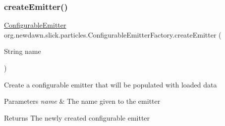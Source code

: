 \subsubsection{\texorpdfstring{create\+Emitter()}{createEmitter()}}
{\footnotesize\ttfamily \mbox{\hyperlink{classorg_1_1newdawn_1_1slick_1_1particles_1_1_configurable_emitter}{Configurable\+Emitter}} org.\+newdawn.\+slick.\+particles.\+Configurable\+Emitter\+Factory.\+create\+Emitter (\begin{DoxyParamCaption}\item[{String}]{name }\end{DoxyParamCaption})}

Create a configurable emitter that will be populated with loaded data


\begin{DoxyParams}{Parameters}
{\em name} & The name given to the emitter \\
\hline
\end{DoxyParams}
\begin{DoxyReturn}{Returns}
The newly created configurable emitter 
\end{DoxyReturn}
